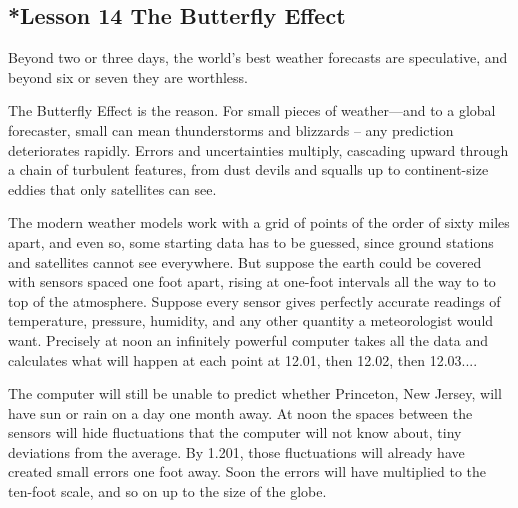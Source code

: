 \documentclass[kindlepaper]{BHCexam4kindle}
\begin{document}
\subsection{*Lesson 14
The Butterfly Effect}
\par
Beyond two or three days, the world's best weather forecasts are speculative, and beyond six or seven they
are worthless.
\par
The Butterfly Effect is the reason. For small pieces of weather—and to a global forecaster, small can mean
thunderstorms and blizzards – any prediction deteriorates rapidly. Errors and uncertainties multiply, cascading
upward through a chain of turbulent features, from dust devils and squalls up to continent-size eddies that only
satellites can see.
\par
The modern weather models work with a grid of points of the order of sixty miles apart, and even so, some
starting data has to be guessed, since ground stations and satellites cannot see everywhere. But suppose the
earth could be covered with sensors spaced one foot apart, rising at one-foot intervals all the way to to top of
the atmosphere. Suppose every sensor gives perfectly accurate readings of temperature, pressure, humidity, and
any other quantity a meteorologist would want. Precisely at noon an infinitely powerful computer takes all the
data and calculates what will happen at each point at 12.01, then 12.02, then 12.03....
\par
The computer will still be unable to predict whether Princeton, New Jersey, will have sun or rain on a day
one month away. At noon the spaces between the sensors will hide fluctuations that the computer will not
know about, tiny deviations from the average. By 1.201, those fluctuations will already have created small
errors one foot away. Soon the errors will have multiplied to the ten-foot scale, and so on up to the size of the
globe.
\clearpage
\end{document}
